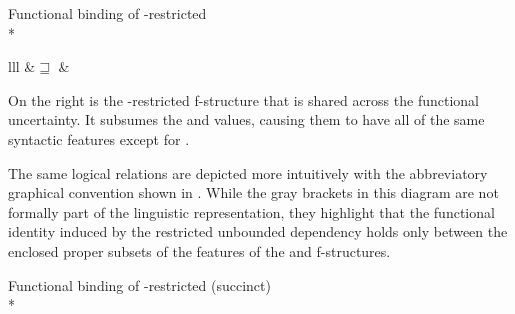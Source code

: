 \documentclass[output=paper,hidelinks]{langscibook}
\begin{document}
\ea\label{casesubsumed}Functional binding of \CASE-restricted \SUBJ\\*
\evnup
{\small\begin{tabular}[c]{lll}
{}
&\hsp{1em}$\sqsupseteq$\hsp{.5em}
&
\hsp{1em}
\end{tabular}
}
\z
\noindent  On the right is the \CASE-restricted f-structure that is shared across the functional uncertainty. It subsumes the \SUBJ and \mbox{\XCOMP \OBJ} values, causing them to have all of the same syntactic features except for \CASE.

The same logical relations are depicted more intuitively with the abbreviatory graphical convention shown in . While the gray brackets in this diagram are not formally part of the linguistic representation, they highlight that the functional identity induced by the restricted unbounded dependency holds only between the enclosed proper subsets of the features of the \SUBJ and \mbox{\XCOMP \OBJ} f-structures.

 \ea\label{mothfssub2}Functional binding of \CASE-restricted \SUBJ (succinct)\\*
\evnup
{\small{}}
 \z
\end{document}
